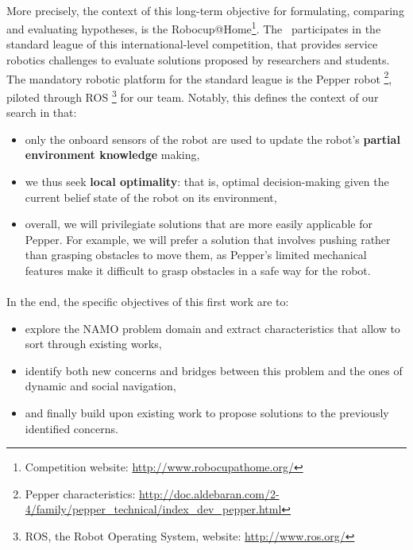 \paragraph{} More precisely, the context of this long-term objective for formulating, comparing and evaluating hypotheses, is the Robocup@Home\footnote{Competition website: \url{http://www.robocupathome.org/}}. The \groupname \, participates in the standard league of this international-level competition, that provides service robotics challenges to evaluate solutions proposed by researchers and students. The mandatory robotic platform for the standard league is the Pepper robot \footnote{Pepper characteristics: \url{http://doc.aldebaran.com/2-4/family/pepper_technical/index_dev_pepper.html}}, piloted through ROS \footnote{ROS, the Robot Operating System, website: \url{http://www.ros.org/}} for our team. Notably, this defines the context of our search in that:
\begin{itemize}
  \item only the onboard sensors of the robot are used to update the robot's \textbf{partial environment knowledge} making,
  \item we thus seek \textbf{local optimality}: that is, optimal decision-making given the current belief state of the robot on its environment,
  \item overall, we will privilegiate solutions that are more easily applicable for Pepper. For example, we will prefer a solution that involves pushing rather than grasping obstacles to move them, as Pepper's limited mechanical features make it difficult to grasp obstacles in a safe way for the robot.
\end{itemize}

\paragraph{} In the end, the specific objectives of this first work are to:
\begin{itemize}
  \item explore the NAMO problem domain and extract characteristics that allow to sort through existing works,
  \item identify both new concerns and bridges between this problem and the ones of dynamic and social navigation,
  \item and finally build upon existing work to propose solutions to the previously identified concerns.
\end{itemize}

